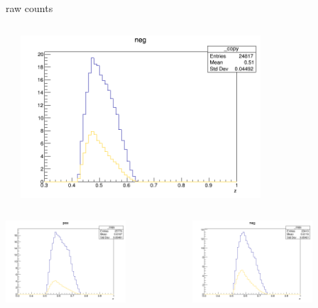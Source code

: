 \begin{frame}{raw counts}
\begin{columns}
\begin{column}[T]{0.25\textwidth}
\end{column}
\begin{column}[T]{0.25\textwidth}
\includegraphics[width = 0.7\textwidth]{results/yield/statistics/yield_x_Q2_z_0.35_4.000_0.50_neg.png}
\end{column}
\end{columns}
\begin{columns}
\begin{column}[T]{0.25\textwidth}
\includegraphics[width = 0.7\textwidth]{results/yield/statistics/yield_x_Q2_z_0.35_4.000_0.60_pos.png}
\end{column}
\begin{column}[T]{0.25\textwidth}
\includegraphics[width = 0.7\textwidth]{results/yield/statistics/yield_x_Q2_z_0.35_4.000_0.60_neg.png}

\end{column}
\end{columns}
\end{frame}
